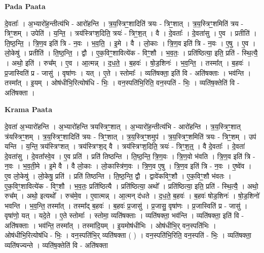\documentclass[17pt]{extarticle}
\begin{document}
\textbf{Pada Paata} \newline

दे॒वताः᳚ । अ॒भ्यारो॑ह॒न्तीत्य॑भि - आरो॑हन्ति । त्र॒य॒स्त्रिꣳ॒॒शादिति॑ त्रयः - त्रिꣳ॒॒शात् । त्र॒य॒स्त्रिꣳ॒॒शमिति॑ त्रय - त्रिꣳ॒॒शम् । उपेति॑ । य॒न्ति॒ । त्रय॑स्त्रिꣳश॒दिति॒ त्रयः॑ - त्रिꣳ॒॒श॒त् । वै । दे॒वताः᳚ । दे॒वता॑सु । ए॒व । प्रतीति॑ । ति॒ष्ठ॒न्ति॒ । त्रि॒ण॒व इति॑ त्रि - न॒वः । भ॒व॒ति॒ । इ॒मे । वै । लो॒काः । त्रि॒ण॒व इति॑ त्रि - न॒वः । ए॒षु । ए॒व । लो॒केषु॑ । प्रतीति॑ । ति॒ष्ठ॒न्ति॒ । द्वौ । ए॒क॒विꣳ॒॒शावित्ये॑क - विꣳ॒॒शौ । भ॒व॒तः॒ । प्रति॑ष्ठित्या॒ इति॒ प्रति॑ - स्थि॒त्यै॒ । अथो॒ इति॑ । रुच᳚म् । ए॒व । आ॒त्मन्न् । द॒ध॒ते॒ । ब॒हवः॑ । षो॒ड॒शिनः॑ । भ॒व॒न्ति॒ । तस्मा᳚त् । ब॒हवः॑ । प्र॒जास्विति॑ प्र - जासु॑ । वृषा॑णः । यत् । ए॒ते । स्तोमाः᳚ । व्यति॑षक्ता॒ इति॑ वि - अति॑षक्ताः । भव॑न्ति । तस्मा᳚त् । इ॒यम् । ओष॑धीभि॒रित्योष॑धि - भिः॒ । वन॒स्पति॑भि॒रिति॒ वन॒स्पति॑ - भिः॒ । व्यति॑ष॒क्तेति॑ वि - अति॑षक्ता ।  \newline


\textbf{Krama Paata} \newline

दे॒वता॑ अ॒भ्यारो॑हन्ति । अ॒भ्यारो॑हन्ति त्रयस्त्रिꣳ॒॒शात् । अ॒भ्यारो॑ह॒न्तीत्य॑भि - आरो॑हन्ति । त्र॒य॒स्त्रिꣳ॒॒शात् 
त्र॑यस्त्रिꣳ॒॒शम् । त्र॒य॒स्त्रिꣳ॒॒शादिति॑ त्रयः - त्रिꣳ॒॒शात् । त्र॒य॒स्त्रिꣳ॒॒शमुप॑ । त्र॒य॒स्त्रिꣳ॒॒शमिति॑ त्रयः - त्रिꣳ॒॒शम् । उप॑ यन्ति । य॒न्ति॒ त्रय॑स्त्रिꣳशत् । त्रय॑स्त्रिꣳश॒द् वै । त्रय॑स्त्रिꣳश॒दिति॒ त्रयः॑ - त्रिꣳ॒॒श॒त्॒ । वै दे॒वताः᳚ । दे॒वता॑ दे॒वता॑सु । दे॒वता᳚स्वे॒व । ए॒व प्रति॑ । प्रति॑ तिष्ठन्ति । ति॒ष्ठ॒न्ति॒ त्रि॒ण॒वः । त्रि॒ण॒वो भ॑वति । त्रि॒ण॒व इति॑ त्रि - न॒वः । भ॒व॒ती॒मे । इ॒मे वै । वै लो॒काः । लो॒कास्त्रि॑ण॒वः । त्रि॒ण॒व ए॒षु । त्रि॒ण॒व इति॑ त्रि - न॒वः । ए॒ष्वे॑व । ए॒व लो॒केषु॑ । लो॒केषु॒ प्रति॑ । प्रति॑ तिष्ठन्ति । ति॒ष्ठ॒न्ति॒ द्वौ । द्वावे॑कविꣳ॒॒शौ । ए॒क॒विꣳ॒॒शौ भ॑वतः । ए॒क॒विꣳ॒॒शावित्ये॑क - विꣳ॒॒शौ । भ॒व॒तः॒ प्रति॑ष्ठित्यै । प्रति॑ष्ठित्या॒ अथो᳚ । प्रति॑ष्ठित्या॒ इति॒ प्रति॑ - स्थि॒त्यै॒ । अथो॒ रुच᳚म् । अथो॒ इत्यथो᳚ । रुच॑मे॒व । ए॒वात्मन्न् । आ॒त्मन् द॑धते । द॒ध॒ते॒ ब॒हवः॑ । ब॒हवः॑ षोड॒शिनः॑ । षो॒ड॒शिनो॑ भवन्ति । भ॒व॒न्ति॒ तस्मा᳚त् । तस्मा᳚द् ब॒हवः॑ । ब॒हवः॑ प्र॒जासु॑ । प्र॒जासु॒ वृषा॑णः । प्र॒जास्विति॑ प्र - जासु॑ । वृषा॑णो॒ यत् । यदे॒ते । ए॒ते स्तोमाः᳚ । स्तोमा॒ व्यति॑षक्ताः । व्यति॑षक्ता॒ भव॑न्ति । व्यति॑षक्ता॒ इति॑ वि - अति॑षक्ताः । भव॑न्ति॒ तस्मा᳚त् । तस्मा॑दि॒यम् । इ॒यमोष॑धीभिः । ओष॑धीभि॒र् वन॒स्पति॑भिः । ओष॑धीभि॒रित्योष॑धि - भिः॒ । वन॒स्पति॑भि॒र् व्यति॑षक्ता ( ) । वन॒स्पति॑भि॒रिति॒ वन॒स्पति॑ - भिः॒ । व्यति॑षक्ता॒ व्यति॑षज्यन्ते । व्यति॑ष॒क्तेति॑ वि - अति॑षक्ता \newline
\end{document}
